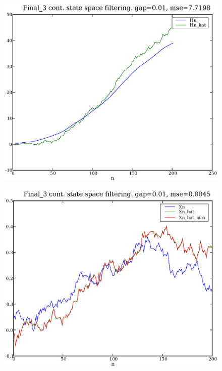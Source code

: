 \documentclass[a4paper,10pt]{article}
\begin{document}
\begin{figure}
\includegraphics[width=1\textwidth]{Final_3_Hn_Hn_hat_gap_0.01.eps}
\caption{}\label{f2}
\end{figure}

\begin{figure}
\includegraphics[width=1\textwidth]{Final_3_Xn_Xn_hat_Xn_hat_max_gap_0.01.eps}
\caption{}\label{f3}
\end{figure}
\end{document}
